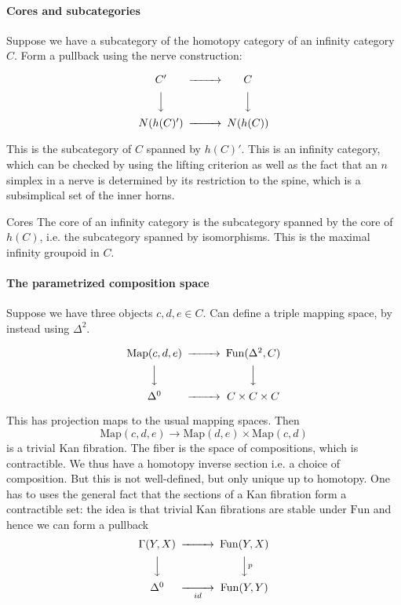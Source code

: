 \paragraph*{Cores and subcategories}
Suppose we have a subcategory of the homotopy category of an infinity category $C$. Form a pullback using the nerve construction: 

$$\begin{CD} C' @>>> C\\ @VVV @VVV \\ N(h(C)') @>>> N(h(C)) \end{CD}$$

This is the subcategory of $C$ spanned by $h(C)'$.  This is an infinity category, which can be checked by using the lifting criterion as well as the fact that an $n$ simplex in a nerve is determined by its restriction to the spine, which is a subsimplical set of the inner horns. 

\begin{definition}{Cores}{}
    The core of an infinity category is the subcategory spanned by the core of $h(C)$, i.e. the subcategory spanned by isomorphisms. This is the maximal infinity groupoid in $C$.

\end{definition}

\paragraph*{The parametrized composition space}

Suppose we have three objects $c,d,e\in C$. Can define a triple mapping space, by instead using $\Delta^2$. 

$$\begin{CD} \mathrm{Map}(c,d,e) @>>> \mathrm{Fun}(\Delta^2, C)\\ @VVV @VVV \\ \Delta^0 @>>> C\times C\times C\end{CD}$$

This has projection maps to the usual mapping spaces. Then $$\mathrm{Map}(c,d,e)\rightarrow \mathrm{Map}(d,e)\times \mathrm{Map}(c,d)$$is a trivial Kan fibration. The fiber is the space of compositions, which is contractible. We thus have a homotopy inverse section i.e. a choice of composition. But this is not well-defined, but only unique up to homotopy. One has to uses the general fact that the sections of a Kan fibration form a contractible set: the idea is that trivial Kan fibrations are stable under $\mathrm{Fun}$ and hence we can form a pullback $$\begin{CD}\Gamma(Y,X)@>>> \mathrm{Fun}(Y,X)\\ @VVV @VVpV \\ \Delta^0 @>>id> \mathrm{Fun}(Y,Y)\end{CD}$$


